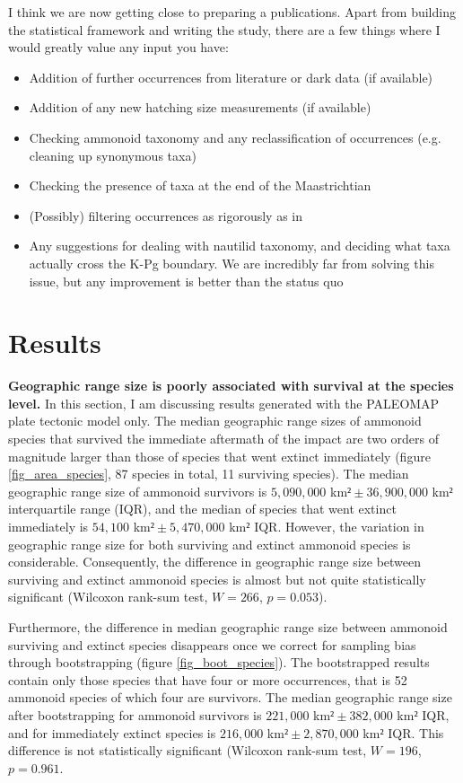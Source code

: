 \documentclass[a4paper]{article}
\begin{document}
I think we are now getting close to preparing a publications. Apart from building the statistical framework and writing the study, there are a few things where I would greatly value any input you have:
\begin{itemize}
\item Addition of further occurrences from literature or dark data (if available)
\item Addition of any new hatching size measurements (if available)
\item Checking ammonoid taxonomy and any reclassification of occurrences (e.g. cleaning up synonymous taxa)
\item Checking the presence of taxa at the end of the Maastrichtian
\item (Possibly) filtering occurrences as rigorously as in \textcite{landmanAmmoniteExtinctionNautilid2014}
\item Any suggestions for dealing with nautilid taxonomy, and deciding what taxa actually cross the K-Pg boundary. We are incredibly far from solving this issue, but any improvement is better than the status quo
\end{itemize}


\section*{Results}

\textbf{Geographic range size is poorly associated with survival at the species level.} In this section, I am discussing results generated with the PALEOMAP plate tectonic model \parencite{scotesePALEOMAPPaleoAtlasGPlates2020} only. The median geographic range sizes of ammonoid species that survived the immediate aftermath of the impact are two orders of magnitude larger than those of species that went extinct immediately (figure \ref{fig_area_species}, 87 species in total, 11 surviving species). The median geographic range size of ammonoid survivors is $5,090,000$ km$² \pm 36,900,000$ km$²$ interquartile range (IQR), and the median of species that went extinct immediately is $54,100$ km$² \pm 5,470,000$ km$²$ IQR. 
However, the variation in geographic range size for both surviving and extinct ammonoid species is considerable. Consequently, the difference in geographic range size between surviving and extinct ammonoid species is almost but not quite statistically significant (Wilcoxon rank-sum test, $W = 266$, $p = 0.053$). 

Furthermore, the difference in median geographic range size between ammonoid surviving and extinct species disappears once we correct for sampling bias through bootstrapping (figure \ref{fig_boot_species}). The bootstrapped results contain only those species that have four or more occurrences, that is 52 ammonoid species of which four are survivors. The median geographic range size after bootstrapping for ammonoid survivors is $221,000$ km$² \pm 382,000$ km$²$ IQR, and for immediately extinct species is $216,000$ km$² \pm 2,870,000$ km$²$ IQR. This difference is not statistically significant (Wilcoxon rank-sum test, $W = 196$, $p = 0.961$.
\end{document}

